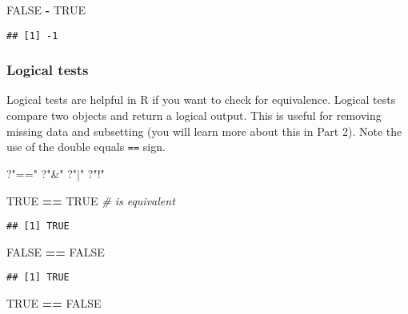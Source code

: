 \documentclass[]{article}
\newenvironment{Shaded}{\begin{snugshade}}{\end{snugshade}}
\newcommand{\StringTok}[1]{\textcolor[rgb]{0.31,0.60,0.02}{#1}}
\newcommand{\CommentTok}[1]{\textcolor[rgb]{0.56,0.35,0.01}{\textit{#1}}}
\newcommand{\OtherTok}[1]{\textcolor[rgb]{0.56,0.35,0.01}{#1}}
\newcommand{\OperatorTok}[1]{\textcolor[rgb]{0.81,0.36,0.00}{\textbf{#1}}}
\newcommand{\NormalTok}[1]{#1}
\begin{document}
\begin{Shaded}
\begin{Highlighting}[]
\OtherTok{FALSE} \OperatorTok{-}\StringTok{ }\OtherTok{TRUE}
\end{Highlighting}
\end{Shaded}

\begin{verbatim}
## [1] -1
\end{verbatim}

\subsubsection{Logical tests}\label{logical-tests}

Logical tests are helpful in R if you want to check for equivalence.
Logical tests compare two objects and return a logical output. This is
useful for removing missing data and subsetting (you will learn more
about this in Part 2). Note the use of the double equals \texttt{==}
sign.

\begin{Shaded}
\begin{Highlighting}[]
\NormalTok{?}\StringTok{"=="}
\NormalTok{?}\StringTok{"&"}
\NormalTok{?}\StringTok{"|"}
\NormalTok{?}\StringTok{"!"}
\end{Highlighting}
\end{Shaded}

\begin{Shaded}
\begin{Highlighting}[]
\OtherTok{TRUE} \OperatorTok{==}\StringTok{ }\OtherTok{TRUE} \CommentTok{# is equivalent}
\end{Highlighting}
\end{Shaded}

\begin{verbatim}
## [1] TRUE
\end{verbatim}

\begin{Shaded}
\begin{Highlighting}[]
\OtherTok{FALSE} \OperatorTok{==}\StringTok{ }\OtherTok{FALSE}
\end{Highlighting}
\end{Shaded}

\begin{verbatim}
## [1] TRUE
\end{verbatim}

\begin{Shaded}
\begin{Highlighting}[]
\OtherTok{TRUE} \OperatorTok{==}\StringTok{ }\OtherTok{FALSE}
\end{Highlighting}
\end{Shaded}
\end{document}

